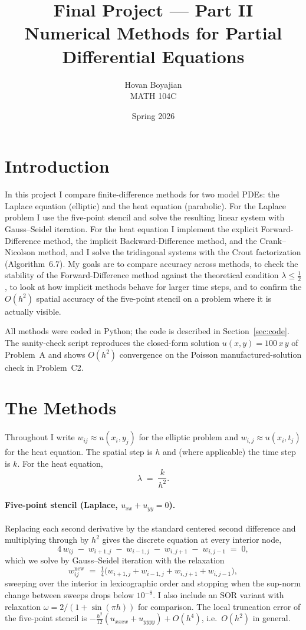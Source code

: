 \documentclass[11pt]{article}
\title{\vspace{-1.5em}\textbf{Final Project --- Part II}\\[0.2em]
\large Numerical Methods for Partial Differential Equations}
\author{Hovan Boyajian \\ \small MATH 104C}
\date{Spring 2026}
\begin{document}
\maketitle

\section{Introduction}
In this project I compare finite-difference methods for two model PDEs: the
Laplace equation (elliptic) and the heat equation (parabolic). For the Laplace
problem I use the five-point stencil and solve the resulting linear system with
Gauss--Seidel iteration. For the heat equation I implement the explicit
Forward-Difference method, the implicit Backward-Difference method, and the
Crank--Nicolson method, and I solve the tridiagonal systems with the Crout
factorization (Algorithm~6.7). My goals are to compare accuracy across methods,
to check the stability of the Forward-Difference method against the theoretical
condition $\lambda \le \tfrac12$, to look at how implicit methods behave for
larger time steps, and to confirm the $O(h^2)$ spatial accuracy of the
five-point stencil on a problem where it is actually visible.

All methods were coded in Python; the code is described in
Section~\ref{sec:code}. The sanity-check script reproduces the closed-form
solution $u(x,y) = 100\,x\,y$ of Problem~A and shows $O(h^2)$ convergence on
the Poisson manufactured-solution check in Problem~C2.

\section{The Methods}\label{sec:methods}
Throughout I write $w_{ij} \approx u(x_i, y_j)$ for the elliptic problem and
$w_{i,j} \approx u(x_i, t_j)$ for the heat equation. The spatial step is $h$
and (where applicable) the time step is $k$. For the heat equation,
\[
\lambda \;=\; \frac{k}{h^{2}}.
\]

\paragraph{Five-point stencil (Laplace, $u_{xx}+u_{yy}=0$).}
Replacing each second derivative by the standard centered second difference
and multiplying through by $h^2$ gives the discrete equation at every interior
node,
\[
4\,w_{ij} \;-\; w_{i+1,j} \;-\; w_{i-1,j} \;-\; w_{i,j+1} \;-\; w_{i,j-1}
\;=\; 0,
\]
which we solve by Gauss--Seidel iteration with the relaxation
\[
w_{ij}^{\text{new}} \;=\; \tfrac14\bigl(
w_{i+1,j} + w_{i-1,j} + w_{i,j+1} + w_{i,j-1}\bigr),
\]
sweeping over the interior in lexicographic order and stopping when the
sup-norm change between sweeps drops below $10^{-8}$. I also include an SOR
variant with relaxation $\omega = 2/(1+\sin(\pi h))$ for comparison. The local
truncation error of the five-point stencil is $-\tfrac{h^{2}}{12}
(u_{xxxx}+u_{yyyy}) + O(h^{4})$, i.e.\ $O(h^{2})$ in general.
\end{document}
